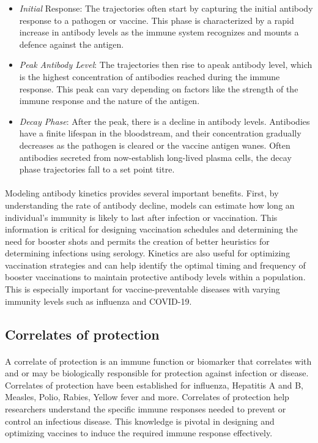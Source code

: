 \begin{itemize}
\item \textit{Initial} Response: The trajectories often start by capturing the initial antibody response to a pathogen or vaccine. This phase is characterized by a rapid increase in antibody levels as the immune system recognizes and mounts a defence against the antigen.

\item \textit{Peak Antibody Level}: The trajectories then rise to apeak antibody level, which is the highest concentration of antibodies reached during the immune response. This peak can vary depending on factors like the strength of the immune response and the nature of the antigen.

\item \textit{Decay Phase}: After the peak, there is a decline in antibody levels. Antibodies have a finite lifespan in the bloodstream, and their concentration gradually decreases as the pathogen is cleared or the vaccine antigen wanes. Often antibodies secreted from now-establish long-lived plasma cells, the decay phase trajectories fall to a set point titre.\cite{srivasta}
\end{itemize}


\paragraph{}Modeling antibody kinetics provides several important benefits. First, by understanding the rate of antibody decline, models can estimate how long an individual's immunity is likely to last after infection or vaccination. This information is critical for designing vaccination schedules and determining the need for booster shots and permits the creation of better heuristics for determining infections using serology. Kinetics are also useful for optimizing vaccination strategies and can help identify the optimal timing and frequency of booster vaccinations to maintain protective antibody levels within a population. This is especially important for vaccine-preventable diseases with varying immunity levels such as influenza and COVID-19.

\subsection{Correlates of protection}
\paragraph{} A correlate of protection is an immune function or biomarker that correlates with and or may be biologically responsible for protection against infection or disease. Correlates of protection have been established for influenza, Hepatitis A and B, Measles, Polio, Rabies, Yellow fever and more.\cite{Plotkin} Correlates of protection help researchers understand the specific immune responses needed to prevent or control an infectious disease. This knowledge is pivotal in designing and optimizing vaccines to induce the required immune response effectively.\cite{}

